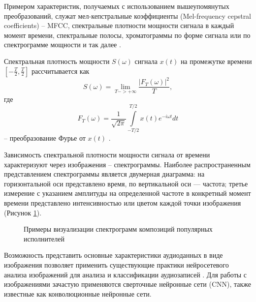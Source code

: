 Примером характеристик, получаемых с использованием вышеупомянутых преобразований, служат мел-кепстральные коэффициенты (Mel-frequency cepstral coefficients) -- MFCC,
спектральные плотности мощности сигнала в каждый момент времени, 
спектральные полосы, хроматограммы по форме сигнала или по спектрограмме мощности и так далее \cite{mus_zhao}.

Спектральная плотность мощности $S(\omega)$ сигнала $x(t)$ на промежутке времени $\left[-\frac{T}{2},\frac{T}{2}\right]$ рассчитывается как
\begin{equation}
	S(\omega) = \lim_{T->+\infty} \frac{\left|F_T(\omega)\right|^2}{T},
\end{equation}
где
\begin{equation}
	F_{T}(\omega )={\frac {1}{\sqrt {2\pi }}}\int \limits _{-T/2}^{T/2}x(t)e^{-i\omega t} dt
\end{equation}
-- преобразование Фурье	от $x(t)$ \cite{otnes}.

Зависимость спектральной плотности мощности сигнала от времени характеризуют через изображения -- спектрограммы.
Наиболее распространенным представлением спектрограммы является двумерная диаграмма: на горизонтальной оси представлено время, 
по вертикальной оси — частота; третье измерение с указанием амплитуды на определенной частоте в конкретный момент времени представлено 
интенсивностью или цветом каждой точки изображения (Рисунок \ref{fig:spec}).

\begin{figure}[H]
	\caption{Примеры визуализации спектрограмм композиций популярных исполнителей}
	\label{fig:spec}
\end{figure}

Возможность представить основные характеристики аудиоданных в виде изображения позволяет применить существующие практики
нейросетевого анализа изображений для анализа и классификации аудиозаписей \cite{cyber_alex}.
Для работы с изображениями зачастую применяются сверточные нейронные сети (CNN), также известные как конволюционные нейронные сети.

